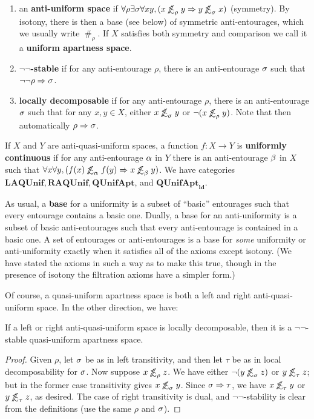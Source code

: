 \documentclass{article}
\def\apart{\mathrel{\#}}
\def\oapt{\mathrel{\!\not\,\not\lesssim}}
\def\aent#1{\oapt_{#1}}
\let\implies\Rightarrow
\def\nn{\ensuremath{\neg\neg}}
\def\LAQUnif{\mathbf{LAQUnif}}
\def\RAQUnif{\mathbf{RAQUnif}}
\def\QUnifApt{\mathbf{QUnifApt}}
\def\ldQUnifApt{\mathbf{QUnifApt}_{\mathbf{ld}}}
\begin{document}
\begin{defn}
\begin{enumerate}[resume]
  \item an \textbf{anti-uniform space} if
    $\forall\rho\exists\si\forall xy, (x\aent\rho y \implies y\aent\si x)$ (symmetry).
    By isotony, there is then a base (see below) of symmetric anti-entourages, which we usually write $\apart_\rho$.
    If $X$ satisfies both symmetry and comparison we call it a \textbf{uniform apartness space}.
  \item \textbf{\nn-stable} if for any anti-entourage $\rho$, there is an anti-entourage $\sigma$ such that $\neg\neg\rho \implies \si$.
  \item \textbf{locally decomposable} if for any anti-entourage $\rho$, there is an anti-entourage $\sigma$ such that for any $x,y\in X$, either $x\aent\si y$ or $\neg(x\aent\rho y)$.
    Note that then automatically $\rho\implies\si$.
  \end{enumerate}
  If $X$ and $Y$ are anti-quasi-uniform spaces, a function $f:X\to Y$ is \textbf{uniformly continuous} if for any anti-entourage $\alpha$ in $Y$ there is an anti-entourage $\beta$ in $X$ such that $\forall x\forall y, (f(x)\aent\al f(y) \implies x\aent\be y)$.
  We have categories $\LAQUnif,\RAQUnif,\QUnifApt$, and $\ldQUnifApt$.
\end{defn}

As usual, a \textbf{base} for a uniformity is a subset of ``basic'' entourages such that every entourage contains a basic one.
Dually, a base for an anti-uniformity is a subset of basic anti-entourages such that every anti-entourage is contained in a basic one.
A set of entourages or anti-entourages is a base for \emph{some} uniformity or anti-uniformity exactly when it satisfies all of the axioms except isotony.
(We have stated the axioms in such a way as to make this true, though in the presence of isotony the filtration axioms have a simpler form.)

Of course, a quasi-uniform apartness space is both a left and right anti-quasi-uniform space.
In the other direction, we have:

\begin{lem}
  If a left or right anti-quasi-uniform space is locally decomposable, then it is a \nn-stable quasi-uniform apartness space.
\end{lem}
\begin{proof}
  Given $\rho$, let $\sigma$ be as in left transitivity, and then let $\tau$ be as in local decomposability for $\sigma$.
  Now suppose $x\aent\rho z$.
  We have either $\neg(y\aent\si z)$ or $y\aent\tau z$; but in the former case transitivity gives $x\aent\si y$.
  Since $\si\implies\tau$, we have $x\aent\tau y$ or $y\aent\tau z$, as desired.
  The case of right transitivity is dual, and \nn-stability is clear from the definitions (use the same $\rho$ and $\sigma$).
\end{proof}
\end{document}
